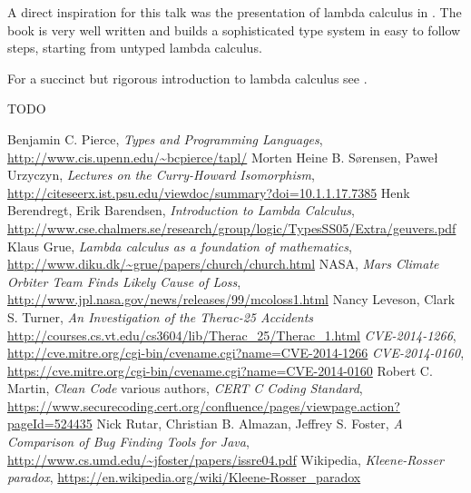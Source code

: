 \documentclass[11pt,twoside,a4paper]{article} %
\begin{document}
A direct inspiration for this talk was the presentation of lambda calculus in
\cite{TAPL}. The book is very well written and builds a sophisticated type
system in easy to follow steps, starting from untyped lambda calculus. 

For a succinct but rigorous introduction to lambda calculus see \cite{bb00}.

TODO

\begin{thebibliography}{9}
 Benjamin C. Pierce, \emph{Types and Programming Languages},
\url{http://www.cis.upenn.edu/~bcpierce/tapl/}
 Morten Heine B. Sørensen, Paweł Urzyczyn, \emph{Lectures on the
Curry-Howard Isomorphism}, 
\url{http://citeseerx.ist.psu.edu/viewdoc/summary?doi=10.1.1.17.7385}
 Henk Berendregt, Erik Barendsen, \emph{Introduction to Lambda
Calculus}, 
\url{http://www.cse.chalmers.se/research/group/logic/TypesSS05/Extra/geuvers.pdf}
 Klaus Grue, \emph{Lambda calculus as a foundation of mathematics},
\url{http://www.diku.dk/~grue/papers/church/church.html}
 NASA, \emph{Mars Climate Orbiter Team Finds Likely Cause of Loss}, 
\url{http://www.jpl.nasa.gov/news/releases/99/mcoloss1.html}
 Nancy Leveson, Clark S. Turner, 
\emph{An Investigation of the Therac-25 Accidents}
\url{http://courses.cs.vt.edu/cs3604/lib/Therac_25/Therac_1.html}
 \emph{CVE-2014-1266},
\url{http://cve.mitre.org/cgi-bin/cvename.cgi?name=CVE-2014-1266}
 \emph{CVE-2014-0160}, 
\url{https://cve.mitre.org/cgi-bin/cvename.cgi?name=CVE-2014-0160}
 Robert C. Martin, \emph{Clean Code}
 various authors, \emph{CERT C Coding Standard}, 
\url{https://www.securecoding.cert.org/confluence/pages/viewpage.action?pageId=524435}
 Nick Rutar, Christian B. Almazan, Jeffrey S. Foster, \emph{A
Comparison of Bug Finding Tools for Java}, 
\url{http://www.cs.umd.edu/~jfoster/papers/issre04.pdf}
 Wikipedia, \emph{Kleene-Rosser paradox},
\url{https://en.wikipedia.org/wiki/Kleene-Rosser_paradox}
\end{thebibliography}
\end{document}
